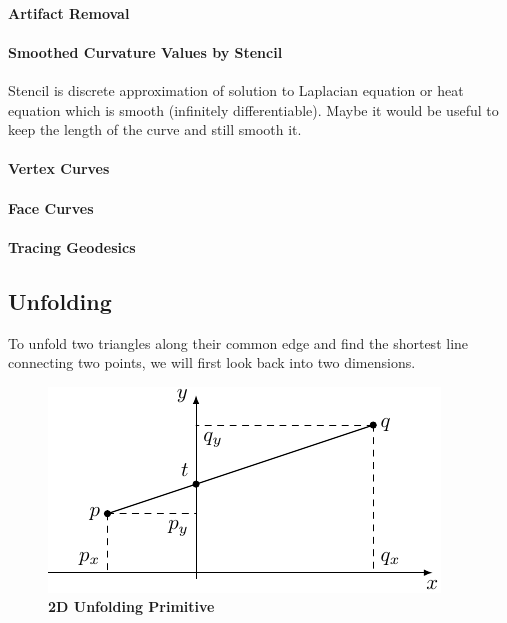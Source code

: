 \documentclass{stdlocal}
\begin{document}
  \paragraph{Artifact Removal}
  \paragraph{Smoothed Curvature Values by Stencil}
    Stencil is discrete approximation of solution to Laplacian equation or heat equation which is smooth (infinitely differentiable).
    Maybe it would be useful to keep the length of the curve and still smooth it.
  \paragraph{Vertex Curves}
  \paragraph{Face Curves}
  \paragraph{Tracing Geodesics}

\subsection{Unfolding} %
\label{sub:unfolding}
To unfold two triangles along their common edge and find the shortest line connecting two points, we will first look back into two dimensions.

\begin{figure}[h]
  \centering
  \includegraphics[width=0.6\linewidth]{figures/unfolding_geodesic_2d.pdf}
  \caption[2D Unfolding Primitive]{%
    \textbf{2D Unfolding Primitive}
  }
\end{figure}
\end{document}
